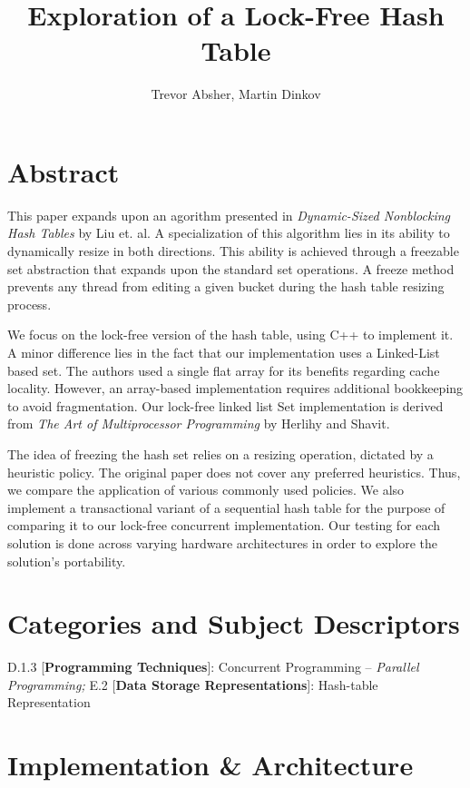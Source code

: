 \documentclass[11pt]{article} %
\title{Exploration of a Lock-Free Hash Table}
\author{Trevor Absher, Martin Dinkov}
\begin{document}
\maketitle

\section{Abstract}

This paper expands upon an agorithm presented in \textit{Dynamic-Sized Nonblocking Hash Tables} by Liu et. al. A specialization of this algorithm lies in its ability to dynamically resize in both directions. This ability is achieved through a freezable set abstraction that expands upon the standard set operations. A freeze method prevents any thread from editing a given bucket during the hash table resizing process.

We focus on the lock-free version of the hash table, using C++ to implement it. A minor difference lies in the fact that our implementation uses a Linked-List based set. The authors used a single flat array for its benefits regarding cache locality. However, an array-based implementation requires additional bookkeeping to avoid fragmentation. Our lock-free linked list Set implementation is derived from \textit{The Art of Multiprocessor Programming} by Herlihy and Shavit.

The idea of freezing the hash set relies on a resizing operation, dictated by a heuristic policy. The original paper does not cover any preferred heuristics. Thus, we compare the application of various commonly used policies. We also implement a transactional variant of a sequential hash table for the purpose of comparing it to our lock-free concurrent implementation. Our testing for each solution is done across varying hardware architectures in order to explore the solution's portability.

\section{Categories and Subject Descriptors}

D.1.3 [\textbf{Programming Techniques}]: Concurrent Programming -- \textit{Parallel Programming;} E.2 [\textbf{Data Storage Representations}]: Hash-table Representation

\section{Implementation & Architecture}
\end{document}
